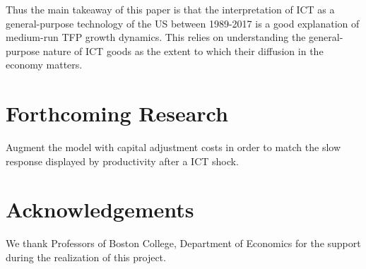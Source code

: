 \documentclass[a0,landscape]{a0poster}
\begin{document}
\begin{multicols}{4}
Thus the main takeaway of this paper is that the interpretation of ICT as a general-purpose technology of the US between 1989-2017 is a good explanation of medium-run TFP growth dynamics. This relies on understanding the general-purpose nature of ICT goods as the extent to which their diffusion in the economy matters. 



\section*{Forthcoming Research}

Augment the model with capital adjustment costs in order to match the slow response displayed by productivity after a ICT shock. 




\section*{Acknowledgements}

We thank Professors of Boston College, Department of Economics for the support during the realization of this project.


\end{multicols}
\end{document}

